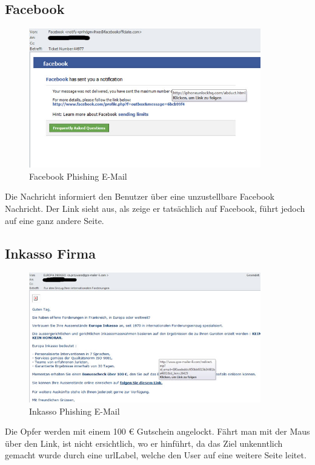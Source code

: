 \subsection{Facebook}
\begin{figure}[H]
  \centering
  \includegraphics[width=0.9\textwidth]{images/phishing-beispiel-facebook.jpg}
  \caption{Facebook Phishing E-Mail}
  \label{fig:phishing:beispiele:facebook}
\end{figure}

Die Nachricht informiert den Benutzer über eine unzustellbare Facebook Nachricht. Der Link sieht aus, als zeige er tatsächlich auf Facebook, führt jedoch auf eine ganz andere Seite. 

\subsection{Inkasso Firma}
\begin{figure}[H]
  \centering
  \includegraphics[width=0.9\textwidth]{images/phishing-beispiel-inkasso.jpg}
  \caption{Inkasso Phishing E-Mail}
  \label{fig:phishing:beispiele:inkasso}
\end{figure}

Die Opfer werden mit einem 100 € Gutschein angelockt. Fährt man mit der Maus über den Link, ist nicht ersichtlich, wo er hinführt, da das Ziel unkenntlich gemacht wurde durch eine \Gls{urlLabel}, welche den User auf eine weitere Seite leitet.

